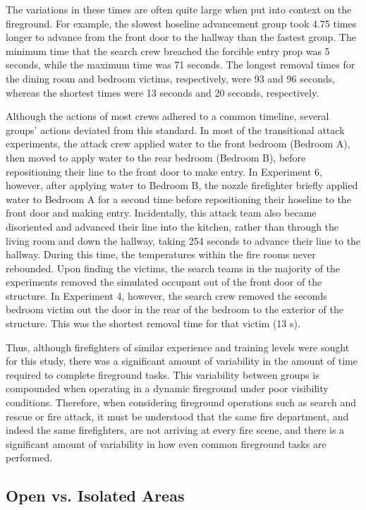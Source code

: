\documentclass[12pt,oneside]{article}
\begin{document}
The variations in these times are often quite large when put into context on the fireground. For example, the slowest hoseline advancement group took 4.75 times longer to advance from the front door to the hallway than the fastest group. The minimum time that the search crew breached the forcible entry prop was 5 seconds, while the maximum time was 71 seconds. The longest removal times for the dining room and bedroom victims, respectively, were 93 and 96 seconds, whereas the shortest times were 13 seconds and 20 seconds, respectively. 

Although the actions of most crews adhered to a common timeline, several groups' actions deviated from this standard. In most of the transitional attack experiments, the attack crew applied water to the front bedroom (Bedroom A), then moved to apply water to the rear bedroom (Bedroom B), before repositioning their line to the front door to make entry. In Experiment 6, however, after applying water to Bedroom B, the nozzle firefighter briefly applied water to Bedroom A for a second time before repositioning their hoseline to the front door and making entry. Incidentally, this attack team also became disoriented and advanced their line into the kitchen, rather than through the living room and down the hallway, taking 254 seconds to advance their line to the hallway. During this time, the temperatures within the fire rooms never rebounded. Upon finding the victims, the search teams in the majority of the experiments removed the simulated occupant out of the front door of the structure. In Experiment 4, however, the search crew removed the seconds bedroom victim out the door in the rear of the bedroom to the exterior of the structure. This was the shortest removal time for that victim (13 s). 

Thus, although firefighters of similar experience and training levels were sought for this study, there was a significant amount of variability in the amount of time required to complete fireground tasks. This variability between groups is compounded when operating in a dynamic fireground under poor visibility conditions. Therefore, when considering fireground operations such as search and rescue or fire attack, it must be understood that the same fire department, and indeed the same firefighters, are not arriving at every fire scene, and there is a significant amount of variability in how even common fireground tasks are performed. 

\subsection{Open vs. Isolated Areas}
\label{subsec:open_v_iso}
\end{document}
